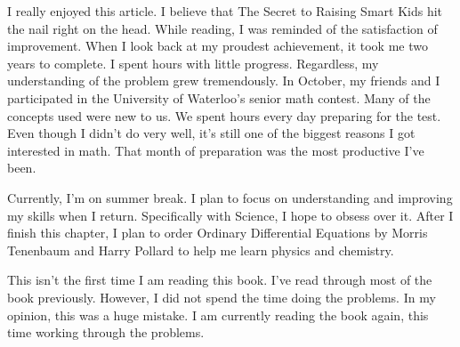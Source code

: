 \noindent
{}

I really enjoyed this article. I believe that The Secret to Raising Smart Kids hit the nail right on the head. While reading, I was reminded of the satisfaction of improvement. When I look back at my proudest achievement, it took me two years to complete. I spent hours with little progress. Regardless, my understanding of the problem grew tremendously. In October, my friends and I participated in the University of Waterloo's senior math contest. Many of the concepts used were new to us. We spent hours every day preparing for the test. Even though I didn't do very well, it's still one of the biggest reasons I got interested in math. That month of preparation was the most productive I've been.

Currently, I'm on summer break. I plan to focus on understanding and improving my skills when I return. Specifically with Science, I hope to obsess over it. After I finish this chapter, I plan to order Ordinary Differential Equations by Morris Tenenbaum and Harry Pollard to help me learn physics and chemistry.

This isn't the first time I am reading this book. I've read through most of the book previously. However, I did not spend the time doing the problems. In my opinion, this was a huge mistake. I am currently reading the book again, this time working through the problems.
